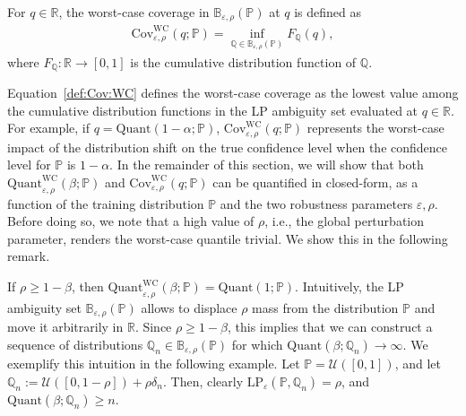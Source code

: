 \documentclass[11pt,a4paper]{article}
\begin{document}
\begin{definition}
\label{def:Cov:WC}
For $q \in \mathbb R$, the worst-case coverage in $\mathbb{B}_{\varepsilon, \rho}(\mathbb P)$ at $q$ is defined as
\begin{align}
\label{eq:Cov:WC}
    \text{Cov}_{\varepsilon,\rho}^{\text{WC}}(q;\mathbb P) = \inf_{\mathbb Q \in \mathbb{B}_{\varepsilon,\rho}(\mathbb P)} F_{\mathbb Q}(q),
\end{align}
where $F_{\mathbb Q}:\mathbb R \to [0,1]$ is the cumulative distribution function of $\mathbb Q$.
\end{definition}

Equation~\eqref{def:Cov:WC} defines the worst-case coverage as the lowest value among the cumulative distribution functions in the LP ambiguity set evaluated at $q \in \mathbb R$. For example, if $q = \text{Quant}(1-\alpha;\mathbb P)$, $\text{Cov}_{\varepsilon,\rho}^{\text{WC}}(q;\mathbb P)$ represents the worst-case impact of the distribution shift on the true confidence level when the confidence level for $\mathbb P$ is $1-\alpha$. In the remainder of this section, we will show that both $\text{Quant}_{\varepsilon,\rho}^{\text{WC}}(\beta;\mathbb P)$ and $\text{Cov}_{\varepsilon,\rho}^{\text{WC}}(q;\mathbb P)$ can be quantified in closed-form, as a function of the training distribution $\mathbb P$ and the two robustness parameters $\varepsilon,\rho$. Before doing so, we note that a high value of $\rho$, i.e., the global perturbation parameter, renders the worst-case quantile trivial. We show this in the following remark.

\begin{remark}
\label{remark:trivial:bound}
If $\rho\geq 1 - \beta$, then $\text{Quant}_{\varepsilon,\rho}^{\text{WC}}(\beta;\mathbb P) = \text{Quant}(1;\mathbb P)$. Intuitively, the LP ambiguity set $\mathbb{B}_{\varepsilon, \rho}(\mathbb P)$ allows to displace $\rho$ mass from the distribution $\mathbb P$ and move it arbitrarily in $\mathbb R$. Since $\rho\geq 1 - \beta$, this implies that we can construct a sequence of distributions $\mathbb Q_n \in \mathbb{B}_{\varepsilon, \rho}(\mathbb P)$ for which $\text{Quant}(\beta;\mathbb Q_n) \to \infty$. We exemplify this intuition in the following example. Let $\mathbb P = \mathcal U([0,1])$, and let $\mathbb Q_n := \mathcal U([0,1-\rho]) + \rho \delta_{n}$. Then, clearly $\text{LP}_{\varepsilon}(\mathbb P, \mathbb Q_n) = \rho$, and $\text{Quant}(\beta;\mathbb Q_n) \geq n$.
\end{remark}
\end{document}
